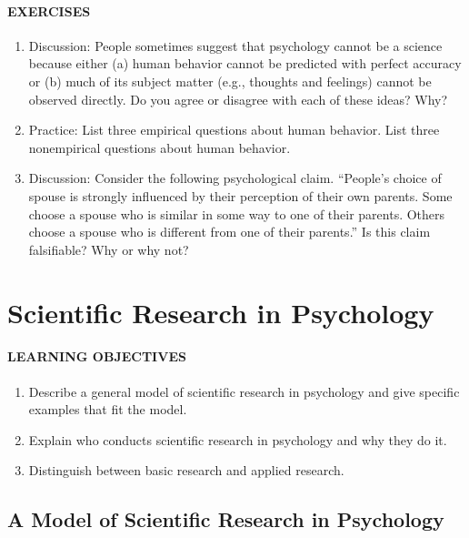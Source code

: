\documentclass[
]{krantz}
\providecommand{\tightlist}{%
  \setlength{\itemsep}{0pt}\setlength{\parskip}{0pt}}
\begin{document}
\paragraph*{EXERCISES}\label{exercises}

\begin{enumerate}
\def\labelenumi{\arabic{enumi}.}
\item
  Discussion: People sometimes suggest that psychology cannot be a science because either (a) human behavior cannot be predicted with perfect accuracy or (b) much of its subject matter (e.g., thoughts and feelings) cannot be observed directly. Do you agree or disagree with each of these ideas? Why?
\item
  Practice: List three empirical questions about human behavior. List three nonempirical questions about human behavior.
\item
  Discussion: Consider the following psychological claim. ``People's choice of spouse is strongly influenced by their perception of their own parents. Some choose a spouse who is similar in some way to one of their parents. Others choose a spouse who is different from one of their parents.'' Is this claim falsifiable? Why or why not?
\end{enumerate}

\section{Scientific Research in Psychology}\label{scientific-research-in-psychology}

\paragraph*{LEARNING OBJECTIVES}\label{learning-objectives-1}

\begin{enumerate}
\def\labelenumi{\arabic{enumi}.}
\tightlist
\item
  Describe a general model of scientific research in psychology and give specific examples that fit the model.
\item
  Explain who conducts scientific research in psychology and why they do it.
\item
  Distinguish between basic research and applied research.
\end{enumerate}

\subsection*{A Model of Scientific Research in Psychology}\label{a-model-of-scientific-research-in-psychology}
\end{document}
